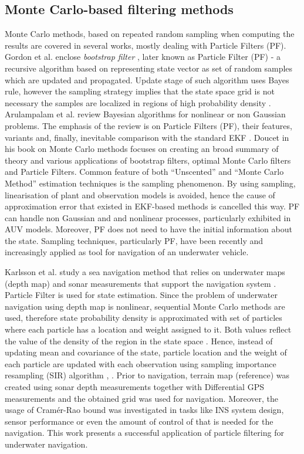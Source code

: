 \subsection{Monte Carlo-based filtering methods}
Monte Carlo methods, based on repeated random sampling when computing the results are covered in several works, mostly dealing with Particle Filters (PF). Gordon et al. enclose \textit{bootstrap filter} \cite{gordon93}, later known as Particle Filter (PF) - a recursive algorithm based on representing state vector as set of random samples which are updated and propagated. Update stage of such algorithm uses Bayes rule, however the sampling strategy implies that the state space grid is not necessary the samples are localized in regions of high probability density \cite{gordon93}. Arulampalam et al. review Bayesian algorithms for nonlinear or non Gaussian problems. The emphasis of the review is on Particle Filters (PF), their features, variants and, finally, inevitable comparison with the standard EKF \cite{arulampalam02}. Doucet in his book on Monte Carlo methods \cite{doucet01} focuses on creating an broad summary of theory and various applications of bootstrap filters, optimal Monte Carlo filters and Particle Filters. Common feature of both ``Unscented'' and ``Monte Carlo Method'' estimation techniques is the sampling phenomenon. By using sampling, linearisation of plant and observation models is avoided, hence the cause of approximation error that existed in EKF-based methods is cancelled this way. PF can handle non Gaussian and and nonlinear processes, particularly exhibited in AUV models. Moreover, PF does not need to have the initial information about the state. Sampling techniques, particularly PF, have been recently and increasingly applied as tool for navigation of an underwater vehicle.

Karlsson et al. study a sea navigation method that relies on underwater maps (depth map) and sonar measurements that support the navigation system \cite{karlsson02}. Particle Filter is used for state estimation. Since the problem of underwater navigation using depth map is nonlinear, sequential Monte Carlo methods are used, therefore state probability density is approximated with set of particles where each particle has a location and weight assigned to it. Both values reflect the value of the density of the region in the state space \cite{karlsson02}. Hence, instead of updating mean and covariance of the state, particle location and the weight of each particle are updated with each observation using sampling importance resampling (SIR) algorithm \cite{karlsson02}, \cite{gordon93}. Prior to navigation, terrain map (reference) was created using sonar depth measurements together with Differential GPS measurements and the obtained grid was used for navigation. Moreover, the usage of Cram\'{e}r-Rao bound was investigated in tasks like INS system design, sensor performance or even the amount of control of that is needed for the navigation. This work presents a successful application of particle filtering for underwater navigation.

